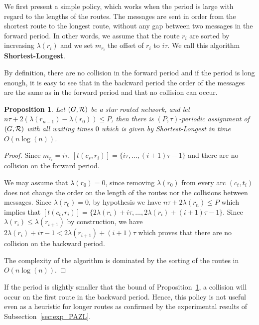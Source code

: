 \documentclass[10pt, conference, letterpaper]{IEEEtran}
\newtheorem{proposition}{Proposition}
\begin{document}
    We first present a simple policy, which works when the period is large with regard to the lengths of the routes.
    The messages are sent in order from the shortest route to the longest route, without any gap between two messages in the forward period.
    In other words, we assume that the route $r_i$ are sorted by increasing $\lambda(r_i)$ and we set $m_{r_i}$ the offset of $r_i$ to $i\tau$. We call this algorithm {\bf Shortest-Longest}.
      
     By definition, there are no collision in the forward period and if the period is long enough, 
     it is easy to see that in the backward period the order of the messages are the same as in the forward period and that no collision can occur. 
      
      
      \begin{proposition} Let $(G, {\cal R})$ be a star routed network, and let $n\tau + 2(\lambda(r_{n-1}) - \lambda(r_{0})) \leq P$, then there is $(P,\tau)$-periodic assignment of $(G, {\cal R})$ with all waiting times $0$ which is given by Shortest-Longest in time $O(n\log(n))$.\label{prop:SL}
      \end{proposition}
      \begin{proof}
       Since $m_{r_i} = i\tau$, $[t(c_s,r_{i})] = \{i\tau,\dots, (i+1)\tau -1\}$ and there are no collision on the forward period.
       
       
       We may assume that $\lambda(r_{0}) = 0$, since removing $\lambda(r_{0})$ from every arc $(c_t,t_i)$ does not change the order on the length of the routes nor the collisions between messages.
       Since $\lambda(r_{0}) = 0$, by hypothesis we have $n\tau + 2\lambda(r_{n}) \leq P$ which implies that
       $[t(c_t,r_{i})] = \{2 \lambda(r_{i}) + i\tau, \dots,  2 \lambda(r_{i}) + (i+1)\tau -1\}$.
       Since $ \lambda(r_{i}) \leq  \lambda(r_{i+1})$ by construction, we have  $2 \lambda(r_{i}) + i\tau -1 < 2 \lambda(r_{i+1}) + (i+1)\tau$ which proves that there are no collision on the backward period. 
       
       The complexity of the algorithm is dominated by the sorting of the routes in $O(n\log(n))$. 
      \end{proof}

      If the period is slightly smaller that the bound of Proposition~\ref{prop:SL}, a collision will occur on the first route in the backward period. Hence, this policy is not useful even as a heuristic for longer routes as confirmed by the experimental results of Subsection~\ref{sec:exp_PAZL}. 
\end{document}
